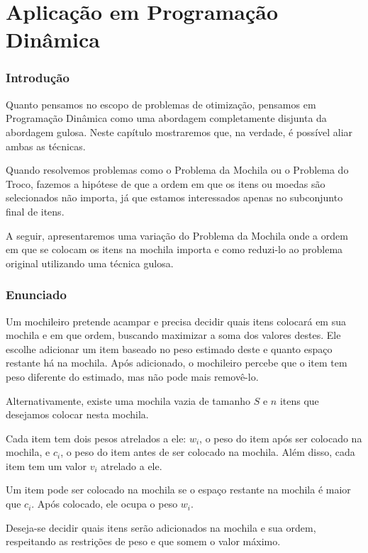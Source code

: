 \chapter{Aplicação em Programação Dinâmica}
\label{pd}

\subsection*{Introdução}

Quanto pensamos no escopo de problemas de otimização, pensamos em Programação Dinâmica como uma abordagem completamente disjunta da abordagem gulosa. Neste capítulo mostraremos que, na verdade, é possível aliar ambas as técnicas.

Quando resolvemos problemas como o Problema da Mochila ou o Problema do Troco, fazemos a hipótese de que a ordem em que os itens ou moedas são selecionados não importa, já que estamos interessados apenas no subconjunto final de itens.

A seguir, apresentaremos uma variação do Problema da Mochila onde a ordem em que se colocam os itens na mochila importa e como reduzi-lo ao problema original utilizando uma técnica gulosa.

\subsection*{Enunciado}

Um mochileiro pretende acampar e precisa decidir quais itens colocará em sua mochila e em que ordem, buscando maximizar a soma dos valores destes. Ele escolhe adicionar um item baseado no peso estimado deste e quanto espaço restante há na mochila. Após adicionado, o mochileiro percebe que o item tem peso diferente do estimado, mas não pode mais removê-lo.

Alternativamente, existe uma mochila vazia de tamanho $S$ e $n$ itens que desejamos colocar nesta mochila.

Cada item tem dois pesos atrelados a ele: $w_i$, o peso do item após ser colocado na mochila, e $c_i$, o peso do item antes de ser colocado na mochila. Além disso, cada item tem um valor $v_i$ atrelado a ele.

Um item pode ser colocado na mochila se o espaço restante na mochila é maior que $c_i$. Após colocado, ele ocupa o peso $w_i$.

Deseja-se decidir quais itens serão adicionados na mochila e sua ordem, respeitando as restrições de peso e que somem o valor máximo.


